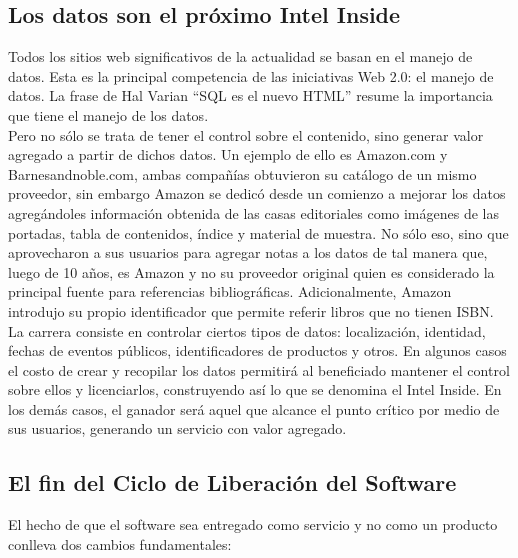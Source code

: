 \subsection{Los datos son el próximo Intel Inside}
Todos los sitios web significativos de la actualidad se basan en el manejo de datos. Esta es la principal competencia de las iniciativas Web 2.0: el manejo de datos. La frase de Hal Varian ``SQL es el nuevo HTML'' resume la importancia que tiene el manejo de los datos.\\

Pero no sólo se trata de tener el control sobre el contenido, sino generar valor agregado a partir de dichos datos. Un ejemplo de ello es Amazon.com y Barnesandnoble.com, ambas compañías obtuvieron su catálogo de un mismo proveedor, sin embargo  Amazon se dedicó desde un comienzo a mejorar los datos agregándoles información obtenida de las casas editoriales como imágenes de las portadas, tabla de contenidos, índice y material de muestra. No sólo eso, sino que aprovecharon a sus usuarios para agregar notas a los datos de tal manera que, luego de 10 años, es Amazon y no su proveedor original quien es considerado la principal fuente para referencias bibliográficas. Adicionalmente, Amazon introdujo su propio identificador que permite referir libros que no tienen ISBN. \\ 

La carrera consiste en controlar ciertos tipos de datos: localización, identidad, fechas de eventos públicos, identificadores de productos y otros. En algunos casos el costo de crear y recopilar los datos permitirá al beneficiado mantener el control sobre ellos y licenciarlos, construyendo así lo que se denomina el Intel Inside. En los demás casos, el ganador será aquel que alcance el punto crítico por medio de sus usuarios, generando un servicio con valor agregado.

\subsection{El fin del Ciclo de Liberación del Software} 
El hecho de que el software sea entregado como servicio y no como un producto conlleva dos cambios fundamentales:

